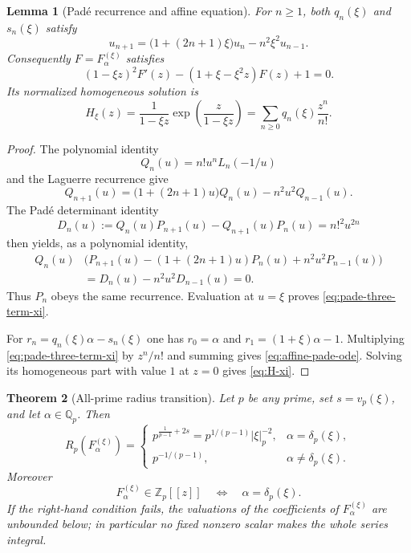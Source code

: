 \documentclass[11pt]{article}
\newtheorem{theorem}{Theorem}[section]
\newtheorem{lemma}[theorem]{Lemma}
\theoremstyle{definition}
\theoremstyle{remark}
\begin{document}
\begin{lemma}[Pad\'e recurrence and affine equation]
\label{lem:pade-recurrence-all-prime}
For $n\geq1$, both $q_n(\xi)$ and $s_n(\xi)$ satisfy
\begin{equation}
 u_{n+1}=\bigl(1+(2n+1)\xi\bigr)u_n-n^2\xi^2u_{n-1}.
\label{eq:pade-three-term-xi}
\end{equation}
Consequently $F=F_\alpha^{(\xi)}$ satisfies
\begin{equation}
 (1-\xi z)^2F'(z)-(1+\xi-\xi^2z)F(z)+1=0.
\label{eq:affine-pade-ode}
\end{equation}
Its normalized homogeneous solution is
\begin{equation}
 H_\xi(z)=\frac{1}{1-\xi z}
 \exp\!\left(\frac{z}{1-\xi z}\right)
 =\sum_{n\geq0}q_n(\xi)\frac{z^n}{n!}.
\label{eq:H-xi}
\end{equation}
\end{lemma}

\begin{proof}
The polynomial identity
\[
 Q_n(u)=n!u^nL_n(-1/u)
\]
and the Laguerre recurrence give
\[
 Q_{n+1}(u)=\bigl(1+(2n+1)u\bigr)Q_n(u)-n^2u^2Q_{n-1}(u).
\]
The Pad\'e determinant identity
\begin{equation}
 D_n(u):=Q_n(u)P_{n+1}(u)-Q_{n+1}(u)P_n(u)=n!^2u^{2n}
\label{eq:pade-casoratian}
\end{equation}
then yields, as a polynomial identity,
\begin{align*}
 Q_n(u)&\bigl(P_{n+1}(u)-(1+(2n+1)u)P_n(u)
                    +n^2u^2P_{n-1}(u)\bigr)\\
 &=D_n(u)-n^2u^2D_{n-1}(u)=0.
\end{align*}
Thus $P_n$ obeys the same recurrence.  Evaluation at $u=\xi$ proves
\eqref{eq:pade-three-term-xi}.

For $r_n=q_n(\xi)\alpha-s_n(\xi)$ one has
$r_0=\alpha$ and $r_1=(1+\xi)\alpha-1$.  Multiplying
\eqref{eq:pade-three-term-xi} by $z^n/n!$ and summing gives
\eqref{eq:affine-pade-ode}.  Solving its homogeneous part with value $1$
at $z=0$ gives \eqref{eq:H-xi}.
\end{proof}

\begin{theorem}[All-prime radius transition]
\label{thm:all-prime-radius}
Let $p$ be any prime, set $s=v_p(\xi)$, and let $\alpha\in\mathbb Q_p$.
Then
\begin{equation}
 R_p\!\left(F_\alpha^{(\xi)}\right)=
 \begin{cases}
 p^{\frac1{p-1}+2s}
   =p^{1/(p-1)}|\xi|_p^{-2},&\alpha=\delta_p(\xi),\\[2mm]
 p^{-1/(p-1)},&\alpha\ne\delta_p(\xi).
 \end{cases}
\label{eq:all-prime-radius}
\end{equation}
Moreover
\begin{equation}
 F_\alpha^{(\xi)}\in\mathbb Z_p[[z]]
 \quad\Longleftrightarrow\quad
 \alpha=\delta_p(\xi).
\label{eq:integrality-matching}
\end{equation}
If the right-hand condition fails, the valuations of the coefficients of
$F_\alpha^{(\xi)}$ are unbounded below; in particular no fixed nonzero
scalar makes the whole series integral.
\end{theorem}
\end{document}

